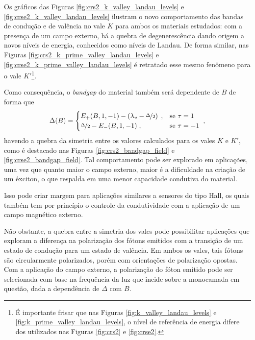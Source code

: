 Os gráficos das Figuras \ref{fig:crs2_k_valley_landau_levels} e
\ref{fig:crse2_k_valley_landau_levels} ilustram o novo comportamento das bandas
de condução e de valência no vale $K$ para ambos os materiais estudados: com a
presença de um campo externo, há a quebra de degenerescência dando origem a
novos níveis de energia, conhecidos como níveis de Landau. De forma similar, nas
Figuras \ref{fig:crs2_k_prime_valley_landau_levels} e
\ref{fig:crse2_k_prime_valley_landau_levels} é retratado esse mesmo fenômeno
para o vale $K'$\footnote{
  É importante frisar que nas Figuras \ref{fig:k_valley_landau_levels} e
  \ref{fig:k_prime_valley_landau_levels}, o nível de referência de energia difere
  dos utilizados nas Figuras \ref{fig:crs2} e \ref{fig:crse2}.
}.

Como consequência, o \textit{bandgap} do material também será dependente de $B$ de forma que
\begin{equation}
  \Delta(B) = 
  \begin{cases}
    E_+(B, 1, -1) - \left( \lambda_v - \nicefrac{\Delta}{2} \right) \;, & \text{se } \tau = 1  \\
    \nicefrac{\Delta}{2} - E_-(B, 1, -1) \;,                            & \text{se } \tau = -1 \\
  \end{cases}
  \;\mathrm{,}
  \label{eq:new_bandgap}
\end{equation}
havendo a quebra da simetria entre os valores calculados para os vales $K$ e
$K'$, como é destacado nas Figuras \ref{fig:crs2_bandgap_field} e
\ref{fig:crse2_bandgap_field}. Tal comportamento pode ser explorado em
aplicações, uma vez que quanto maior o campo externo, maior é a dificuldade na
criação de um éxciton, o que respalda em uma menor capacidade condutiva do
material.  

Isso pode criar margem para aplicações similares a sensores do tipo Hall, os quais
também tem por princípio o controle da condutividade com a aplicação de um campo
magnético externo. 

Não obstante, a quebra entre a simetria dos vales pode possibilitar aplicações
que exploram a diferença na polarização dos fótons emitidos com a transição de
um estado de condução para um estado de valência. Em ambos os vales, tais fótons
são circularmente polarizados, porém com orientações de polarização opostas. Com
a aplicação do campo externo, a polarização do fóton emitido pode ser
selecionada com base na frequência da luz que incide sobre a monocamada em
questão, dada a dependência de $\Delta$ com $B$.

